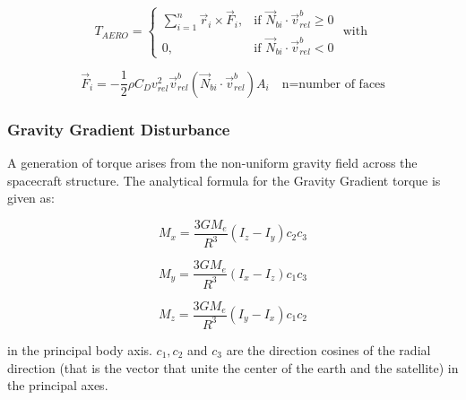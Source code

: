 \[
T_{AERO} =
\begin{cases}
	\sum_{i=1}^{n} \vec{r}_i \times \vec{F}_i, & \text{if } \vec{N}_{bi} \cdot \vec{v}^{b}_{rel} \geq 0 \\
	0, & \text{if } \vec{N}_{bi} \cdot \vec{v}^{b}_{rel} < 0
\end{cases}
\text{ with }
\]

\[
\vec{F}_i = -\frac{1}{2} \rho C_D v_{rel}^2 \vec{v}_{rel}^{b} (\vec{N}_{bi} \cdot \vec{v}_{rel}^{b}) A_i \quad \text{n=number of faces}
\]


\subsubsection{Gravity Gradient Disturbance}

A generation of torque arises from the non-uniform gravity field across the spacecraft structure. The analytical formula for the Gravity Gradient torque is given as:

\[
M_x = \frac{3G M_e}{R^3} (I_z - I_y) c_2 c_3
\]

\[
M_y = \frac{3G M_e}{R^3} (I_x - I_z) c_1 c_3
\]

\[
M_z = \frac{3G M_e}{R^3} (I_y - I_x) c_1 c_2
\]

in the principal body axis. \( c_1, c_2 \) and \( c_3 \) are the direction cosines of the radial direction (that is the vector that unite the center of the earth and the satellite) in the principal axes.


\label{subsubsec:dist_GG}
